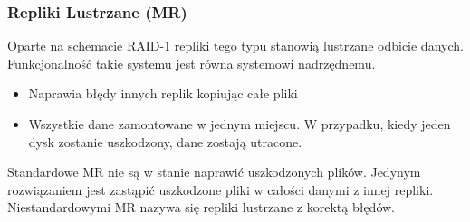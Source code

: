 \subsubsection{Repliki Lustrzane (MR)}
Oparte na schemacie RAID-1 repliki tego typu stanowią lustrzane odbicie danych. Funkcjonalność takie systemu jest równa systemowi nadrzędnemu. 
\begin{itemize}
        \item Naprawia błędy innych replik kopiując całe pliki
        \item Wszystkie dane zamontowane w jednym miejscu. W przypadku, kiedy jeden dysk zostanie uszkodzony, dane zostają utracone.
\end{itemize}
Standardowe MR nie są w stanie naprawić uszkodzonych plików. Jedynym rozwiązaniem jest zastąpić uszkodzone pliki w całości danymi z innej repliki. Niestandardowymi MR nazywa się repliki lustrzane z korektą błędów.

